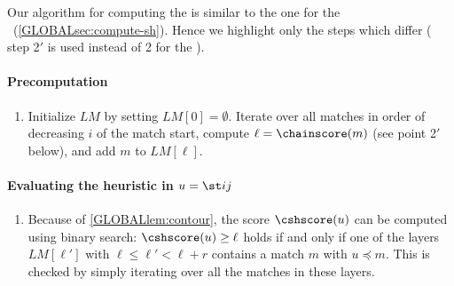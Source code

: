 Our algorithm for computing the \csh is similar to the one for the
\sh~(\cref{GLOBALsec:compute-sh}). Hence we highlight only the steps which differ (\AG
step 2$'$ is used instead of 2 for the \sh).

\paragraph{Precomputation}
\renewcommand\theenumi{\algletter\arabic{enumi}$'$}
\renewcommand\labelenumi{{\rmfamily \algletter\arabic{enumi}$'$.}}
\setlength{\leftmargini}{2.3em}
\begin{samepage}
\newcommand{\algletter}{R}
\begin{enumerate}
  \addtocounter{enumi}{4} %
  \item Initialize $LM$ by setting $LM[0] = \emptyset$. Iterate over all
        matches in order of decreasing $i$ of the match start, compute
        $\ell=\chainscore(m)$ (see point 2$'$ below), and add $m$ to $LM[\ell]$.
\end{enumerate}
\end{samepage}

\paragraph{Evaluating the heuristic in $u = \st ij$}
\begin{samepage}
\newcommand{\algletter}{E}
\begin{enumerate}
  \addtocounter{enumi}{1} %
  \item Because of \cref{GLOBALlem:contour}, the score $\cshscore(u)$
        can be computed using binary search: $\cshscore(u) \geq \ell$ holds if
        and only if one of the layers $LM[\ell']$ with ${\ell\leq \ell'<\ell+r}$
        contains a match $m$ with $u\preceq m$. This is checked by simply iterating over
        all the matches in these layers.
\end{enumerate}
\end{samepage}

